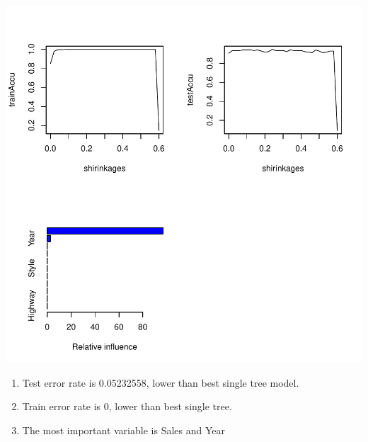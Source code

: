\documentclass[a4paper]{article}
\begin{document}
\includegraphics{tree-4}

{\color{red}
\begin{enumerate}
\item Test error rate is 0.05232558, lower than best single tree model.
\item Train error rate is 0, lower than best single tree.
\item The most important variable is Sales and Year
\end{enumerate}
}
\end{document}
